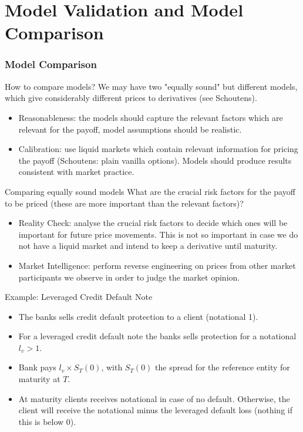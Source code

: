 
\part{Model Validation and Model Comparison}                          %


\section{Model Comparison}

{How to compare models?}
We may have two "equally sound" but different models, which give considerably different prices to derivatives (see Schoutens).

\begin{itemize}
\item<1-> Reasonableness: the models should capture the relevant factors which are relevant for the payoff, model assumptions should be realistic.
\item<2-> Calibration: use liquid markets which contain relevant information for pricing the payoff (Schoutens: plain vanilla options). Models should produce results consistent with market practice.
\end{itemize}

{Comparing equally sound models}
What are the crucial risk factors for the payoff to be priced (these are more important than the relevant factors)?
\begin{itemize}
\item<1-> Reality Check: analyse the crucial risk factors to decide which ones will be important for future price movements. This is not so important in case we do not have a liquid market and intend to keep a derivative until maturity.
\item<2-> Market Intelligence: perform reverse engineering on prices from other market participants we observe in order to judge the market opinion.
\end{itemize}

{Example: Leveraged Credit Default Note}
\begin{itemize}
\item<1-> The banks sells credit default protection to a client (notational 1).
\item<2-> For a leveraged credit default note the banks sells protection for a notational $l_v>1$.
\item<3-> Bank pays $l_v \times S_T(0)$, with $S_T(0)$ the spread for the reference entity for maturity at $T$.
\item<4-> At maturity clients receives notational in case of no default. Otherwise, the client will receive the notational minus the leveraged default loss (nothing if this is below 0).
\end{itemize}

